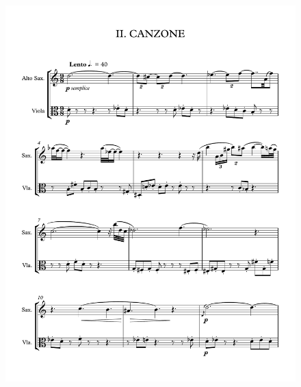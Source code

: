 \begin{figure}[htbp]
    \centering
	\includegraphics[width=6.5in]{figures/Sax_Viola_15.pdf}
\end{figure}

